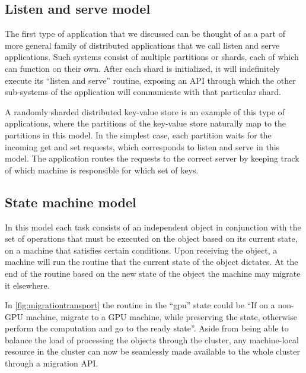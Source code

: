 \subsection{Listen and serve model}
The first type of application that we discussed can be thought of as a
part of more general family of distributed applications that we call
listen and serve applications. Such systems consist of multiple partitions or
shards, each of which can function on their own. After each shard is
initialized, it will indefinitely execute its ``listen and serve'' routine,
exposing an API through which the other sub-systems of the application
will communicate with that particular shard.


A randomly sharded distributed
key-value store is an example of this type of applications, where the
partitions of the key-value store naturally map to the partitions in this
model. In the simplest case, each partition waits for the incoming
get and set requests, which corresponds to listen and serve in this model.
The application routes the requests to the correct server by keeping track
of which machine is responsible for which set of keys.

\subsection{State machine model}
In this model each task consists of an
independent object in conjunction with the set of operations that must be
executed on the object based on its current state, on a machine that satisfies
certain conditions. Upon receiving the object, a machine will run the
routine that the current state of the object dictates. At the end of the
routine based on the new state of the object the machine may migrate it
elsewhere.

In \autoref{fig:migrationtransport} the routine in the ``gpu''
state could be
``If on a non-GPU machine, migrate to a GPU machine,
while preserving the state, otherwise perform the computation and
go to the ready state''.
Aside from being able to balance the load of processing the objects through
the cluster, any machine-local resource in the cluster can now be seamlessly
made available to the whole cluster through a migration API.


